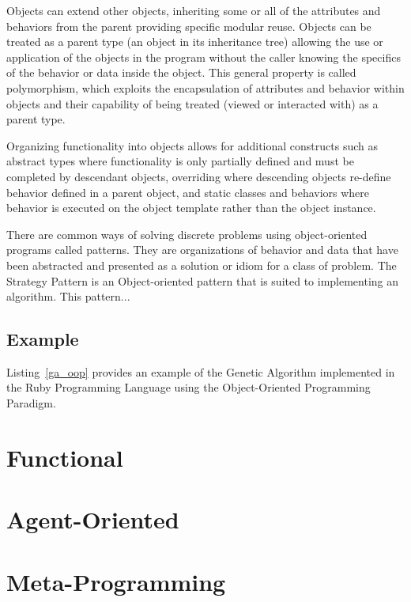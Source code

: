 \documentclass[a4paper, 11pt]{article}
\begin{document}
Objects can extend other objects, inheriting some or all of the attributes and behaviors from the parent providing specific modular reuse. Objects can be treated as a parent type (an object in its inheritance tree) allowing the use or application of the objects in the program without the caller knowing the specifics of the behavior or data inside the object. This general property is called polymorphism, which exploits the encapsulation of attributes and behavior within objects and their capability of being treated (viewed or interacted with) as a parent type.

Organizing functionality into objects allows for additional constructs such as abstract types where functionality is only partially defined and must be completed by descendant objects, overriding where descending objects re-define behavior defined in a parent object, and static classes and behaviors where behavior is executed on the object template rather than the object instance. 

There are common ways of solving discrete problems using object-oriented programs called patterns. They are organizations of behavior and data that have been abstracted and presented as a solution or idiom for a class of problem. The Strategy Pattern is an Object-oriented pattern that is suited to implementing an algorithm. This pattern...

\subsection{Example}
Listing~\ref{ga_oop} provides an example of the Genetic Algorithm implemented in the Ruby Programming Language using the Object-Oriented Programming Paradigm. 


\section{Functional}

\section{Agent-Oriented}

\section{Meta-Programming}
\end{document}
